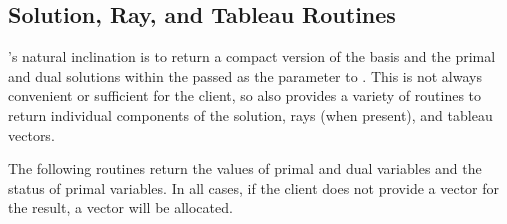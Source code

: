 \subsection{Solution, Ray, and Tableau Routines}
\label{sec:SolutionRoutines}

\dylp's natural inclination is to return a compact version of the basis
and the primal and dual solutions
within the  passed as the  parameter to
.
This is not always convenient or sufficient for the client, so \dylp also
provides a variety of routines to return individual components of the
solution, rays (when present), and tableau vectors.


The following routines return the values of primal and dual variables and the
status of primal variables.
In all cases, if the client does not provide a vector for the result, a vector
will be allocated.


